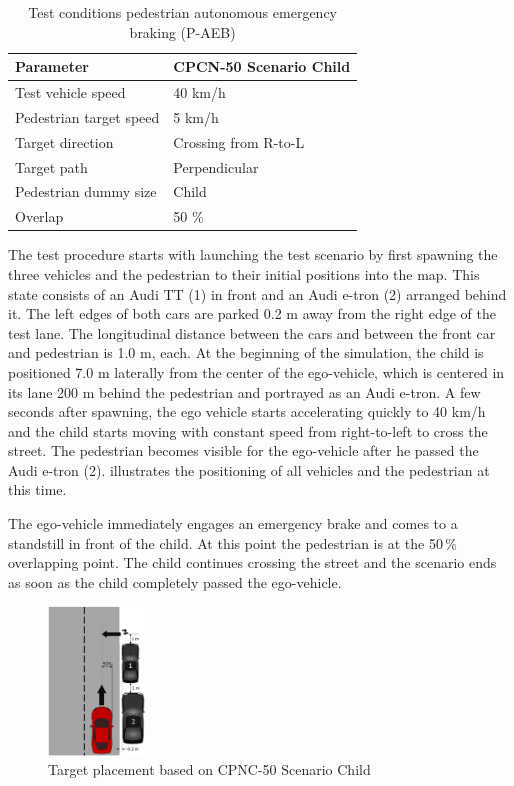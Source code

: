 \begin{table}[h]
	\caption{Test conditions pedestrian autonomous emergency braking (P-AEB) \cite{Protocoll}}
	\label{Test conditions}
	\begin{center}
		\begin{tabular}{l l}
			\hline
			Parameter & CPCN-50 Scenario Child\\
			\hline
			Test vehicle speed & 40 km/h\\
			Pedestrian target speed & 5 km/h\\
			Target direction        & Crossing from R-to-L\\
			Target path             & Perpendicular\\
			Pedestrian dummy size   & Child\\
			Overlap                 & 50 \%\\
			\hline
			
			
		\end{tabular}
	\end{center}
\end{table}



The test procedure starts with launching the test scenario by first spawning the three vehicles and the pedestrian to their initial positions into the map. This state consists of an Audi TT (1) in front and an Audi e-tron (2) arranged behind it. The left edges of both cars are parked 0.2 m away from the right edge of the test lane. The longitudinal distance between the cars and between the front car and pedestrian is 1.0 m, each. At the beginning of the simulation, the child is positioned 7.0 m laterally from the center of the ego-vehicle, which is centered in its lane 200 m behind the pedestrian and portrayed as an Audi e-tron. A few seconds after spawning, the ego vehicle starts accelerating quickly to 40 km/h and the child starts moving with constant speed from right-to-left to cross the street. The pedestrian becomes visible for the ego-vehicle after he passed the Audi e-tron (2).  illustrates the positioning of all vehicles and the pedestrian at this time.

The ego-vehicle immediately engages an emergency brake and comes to a standstill in front of the child. At this point the pedestrian is at the 50\,\% overlapping point. The child continues crossing the street and the scenario ends as soon as the child completely passed the ego-vehicle.
\begin{figure}[htbp]
	\centering
	\includegraphics[width=0.23\textwidth]{images/Target_Placement_test_scenario.png}
	\caption{Target placement based on CPNC-50 Scenario Child \cite{Protocoll}}
	\label{fig:coordination}
\end{figure}


